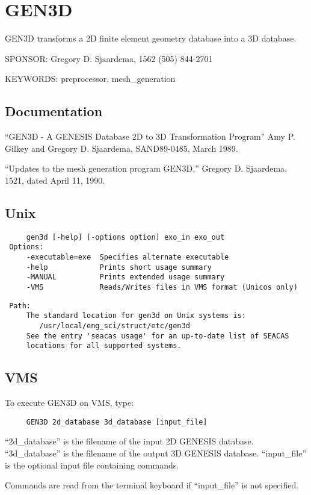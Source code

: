 
\section{GEN3D}
GEN3D transforms a 2D finite element geometry database into a 3D database.

SPONSOR:  Gregory D. Sjaardema, 1562 (505) 844-2701

KEYWORDS: preprocessor, mesh\_generation
\subsection{Documentation  }
``GEN3D - A GENESIS Database 2D to 3D Transformation Program''
Amy P. Gilkey and Gregory D. Sjaardema, SAND89-0485,
March 1989.

``Updates to the mesh generation program GEN3D,''
Gregory D. Sjaardema, 1521, dated April 11, 1990.

\subsection{Unix}
\begin{verbatim}
     gen3d [-help] [-options option] exo_in exo_out
 Options:
     -executable=exe  Specifies alternate executable
     -help            Prints short usage summary
     -MANUAL          Prints extended usage summary
     -VMS             Reads/Writes files in VMS format (Unicos only)
\end{verbatim}
\begin{verbatim}
 Path:
     The standard location for gen3d on Unix systems is:
        /usr/local/eng_sci/struct/etc/gen3d
     See the entry 'seacas usage' for an up-to-date list of SEACAS
     locations for all supported systems.
\end{verbatim}
\subsection{VMS}
To execute GEN3D on VMS, type:

\begin{verbatim}
     GEN3D 2d_database 3d_database [input_file]
\end{verbatim}

``2d\_database'' is the filename of the input  2D GENESIS database.
``3d\_database'' is the filename of the output 3D GENESIS database.
``input\_file''  is the optional input file containing commands.

Commands are read from the terminal keyboard if ``input\_file''
is not specified.

